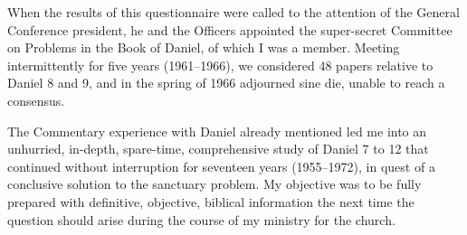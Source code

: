 When the results of this questionnaire were called to the attention of the
General Conference president, he and the Officers appointed the super-secret
Committee on Problems in the Book of Daniel, of which I was a member.
Meeting intermittently for five years (1961--1966), we considered 48 papers
relative to Daniel 8 and 9, and in the spring of 1966 adjourned sine die,
unable to reach a consensus.

The Commentary experience with Daniel already mentioned led me into an
unhurried, in-depth, spare-time, comprehensive study of Daniel 7 to 12
that continued without interruption for seventeen years (1955--1972), in
quest of a conclusive solution to the sanctuary problem. My objective was to
be fully prepared with definitive, objective, biblical information the next
time the question should arise during the course of my ministry for the
church.


